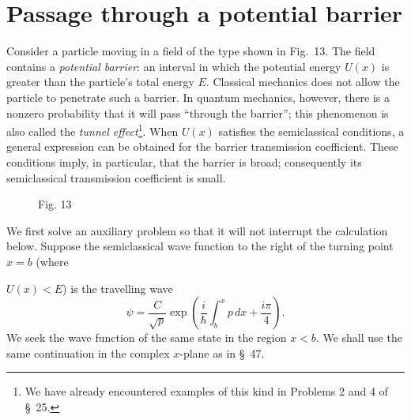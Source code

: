 \section{Passage through a potential barrier}

Consider a particle moving in a field of the type shown in Fig.~13. The field
contains a \emph{potential barrier}: an interval in which the potential energy
$U(x)$ is greater than the particle's total energy $E$. Classical mechanics
does not allow the particle to penetrate such a barrier. In quantum mechanics,
however, there is a nonzero probability that it will pass ``through the
barrier''; this phenomenon is also called the \emph{tunnel effect}\footnote{We
have already encountered examples of this kind in Problems 2 and 4 of
\S~25.}. When $U(x)$ satisfies the semiclassical conditions, a general
expression can be obtained for the barrier transmission coefficient. These
conditions imply, in particular, that the barrier is broad; consequently its
semiclassical transmission coefficient is small.

\begin{figure}[ht]
\centering
{}
\par\smallskip Fig. 13
\end{figure}

We first solve an auxiliary problem so that it will not interrupt the
calculation below. Suppose the semiclassical wave function to the right of the
turning point $x=b$ (where

$U(x)<E$) is the travelling wave
\begin{equation}
 \psi=\frac{C}{\sqrt p}\exp\left(\frac{i}{\hbar}\int_b^x p\,dx+\frac{i\pi}{4}\right).
 \tag{50.1}
\end{equation}
We seek the wave function of the same state in the region $x<b$. We shall use
the same continuation in the complex $x$-plane as in \S~47.

